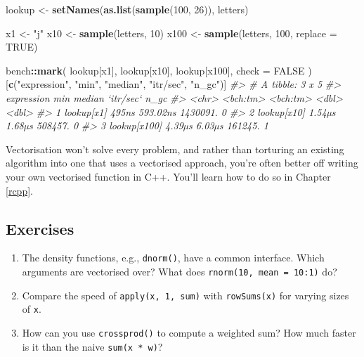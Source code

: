 \documentclass[]{book}
\newenvironment{Shaded}{\begin{snugshade}}{\end{snugshade}}
\newcommand{\CommentTok}[1]{\textcolor[rgb]{0.37,0.37,0.37}{\textit{#1}}}
\newcommand{\DataTypeTok}[1]{\textcolor[rgb]{0.27,0.27,0.27}{#1}}
\newcommand{\DecValTok}[1]{\textcolor[rgb]{0.06,0.06,0.06}{#1}}
\newcommand{\KeywordTok}[1]{\textcolor[rgb]{0.27,0.27,0.27}{\textbf{#1}}}
\newcommand{\NormalTok}[1]{#1}
\newcommand{\OperatorTok}[1]{\textcolor[rgb]{0.43,0.43,0.43}{\textbf{#1}}}
\newcommand{\OtherTok}[1]{\textcolor[rgb]{0.37,0.37,0.37}{#1}}
\newcommand{\StringTok}[1]{\textcolor[rgb]{0.5,0.5,0.5}{#1}}
\begin{document}
\begin{Shaded}
\begin{Highlighting}[]
\NormalTok{lookup <-}\StringTok{ }\KeywordTok{setNames}\NormalTok{(}\KeywordTok{as.list}\NormalTok{(}\KeywordTok{sample}\NormalTok{(}\DecValTok{100}\NormalTok{, }\DecValTok{26}\NormalTok{)), letters)}

\NormalTok{x1 <-}\StringTok{ "j"}
\NormalTok{x10 <-}\StringTok{ }\KeywordTok{sample}\NormalTok{(letters, }\DecValTok{10}\NormalTok{)}
\NormalTok{x100 <-}\StringTok{ }\KeywordTok{sample}\NormalTok{(letters, }\DecValTok{100}\NormalTok{, }\DataTypeTok{replace =} \OtherTok{TRUE}\NormalTok{)}

\NormalTok{bench}\OperatorTok{::}\KeywordTok{mark}\NormalTok{(}
\NormalTok{  lookup[x1],}
\NormalTok{  lookup[x10],}
\NormalTok{  lookup[x100],}
  \DataTypeTok{check =} \OtherTok{FALSE}
\NormalTok{)[}\KeywordTok{c}\NormalTok{(}\StringTok{"expression"}\NormalTok{, }\StringTok{"min"}\NormalTok{, }\StringTok{"median"}\NormalTok{, }\StringTok{"itr/sec"}\NormalTok{, }\StringTok{"n_gc"}\NormalTok{)]}
\CommentTok{#> # A tibble: 3 x 5}
\CommentTok{#>   expression        min   median `itr/sec`  n_gc}
\CommentTok{#>   <chr>        <bch:tm> <bch:tm>     <dbl> <dbl>}
\CommentTok{#> 1 lookup[x1]      495ns 593.02ns  1430091.     0}
\CommentTok{#> 2 lookup[x10]    1.54µs   1.68µs   508457.     0}
\CommentTok{#> 3 lookup[x100]   4.39µs   6.03µs   161245.     1}
\end{Highlighting}
\end{Shaded}

Vectorisation won't solve every problem, and rather than torturing an existing algorithm into one that uses a vectorised approach, you're often better off writing your own vectorised function in C++. You'll learn how to do so in Chapter \ref{rcpp}.

\hypertarget{exercises-20}{%
\subsection{Exercises}\label{exercises-20}}

\begin{enumerate}
\def\labelenumi{\arabic{enumi}.}
\item
  The density functions, e.g., \texttt{dnorm()}, have a common interface. Which
  arguments are vectorised over? What does \texttt{rnorm(10,\ mean\ =\ 10:1)} do?
\item
  Compare the speed of \texttt{apply(x,\ 1,\ sum)} with \texttt{rowSums(x)} for varying sizes
  of \texttt{x}.
\item
  How can you use \texttt{crossprod()} to compute a weighted sum? How much faster is
  it than the naive \texttt{sum(x\ *\ w)}?
\end{enumerate}
\end{document}
